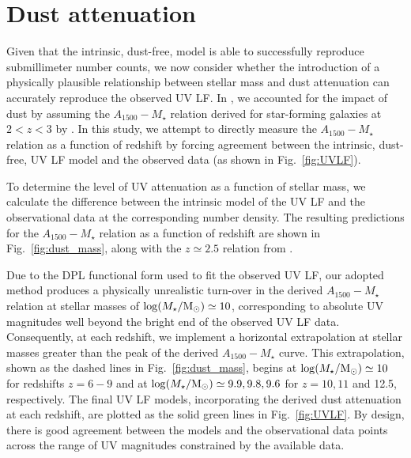 \documentclass[fleqn,usenatbib]{mnras}
\begin{document}
\section{Dust attenuation}
\label{sec:dust_attenuation}
Given that the intrinsic, dust-free, model is able to successfully reproduce submillimeter number counts, we now consider whether the introduction of a physically plausible relationship between stellar mass and dust attenuation can accurately reproduce the observed UV LF. In \citet{donnan2024}, we accounted for the impact of dust by assuming the $A_{1500}-M_{\star}$ relation derived for star-forming galaxies at $2<z<3$ by \citet{mclure2018}. In this study, we attempt to directly measure the $A_{1500}-M_{\star}$ relation as a function of redshift by forcing agreement between the intrinsic, dust-free, UV LF model and the observed data (as shown in Fig.~\ref{fig:UVLF}).

To determine the level of UV attenuation as a function of stellar mass, we calculate the difference between the intrinsic model of the UV LF and the observational data at the corresponding number density. The resulting predictions for the $A_{1500}-M_{\star}$ relation as a function of redshift are shown in Fig.~\ref{fig:dust_mass}, along with the $z \simeq 2.5$ relation from \citet{mclure2018}.

Due to the DPL functional form used to fit the observed UV LF, our adopted method produces a physically unrealistic turn-over in the derived $A_{1500}-M_{\star}$ relation at stellar masses of $\log(M_{\star}/ \rm M_{\odot})\simeq 10$, corresponding to absolute UV magnitudes well beyond the bright end of the observed UV LF data.
Consequently, at each redshift, we implement a horizontal extrapolation at stellar masses greater than the peak of the derived $A_{1500}-M_{\star}$ curve. 
This extrapolation, shown as the dashed lines in Fig.~\ref{fig:dust_mass}, begins at $\log(M_{\star}/ \rm M_{\odot})\simeq10$ for redshifts $z=6-9$ and at $\log(M_{\star}/ \rm M_{\odot})\simeq 9.9, 9.8, 9.6$ for $z=10, 11$ and 12.5, respectively. The final UV LF models, incorporating the derived dust attenuation at each redshift, are plotted as the solid green lines in Fig.~\ref{fig:UVLF}. By design, there is good agreement between the models and the observational data points across the range of UV magnitudes constrained by the available data. 
\end{document}
